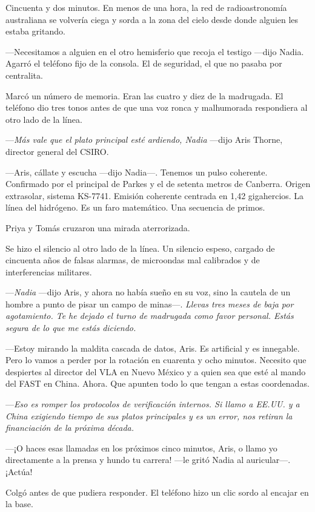 \documentclass[11pt,a5paper,twoside]{book}
\begin{document}
Cincuenta y dos minutos. En menos de una hora, la red de radioastronomía australiana se volvería ciega y sorda a la zona del cielo desde donde alguien les estaba gritando.

—Necesitamos a alguien en el otro hemisferio que recoja el testigo —dijo Nadia. Agarró el teléfono fijo de la consola. El de seguridad, el que no pasaba por centralita.

Marcó un número de memoria. Eran las cuatro y diez de la madrugada. El teléfono dio tres tonos antes de que una voz ronca y malhumorada respondiera al otro lado de la línea.

—\textit{Más vale que el plato principal esté ardiendo, Nadia} —dijo Aris Thorne, director general del CSIRO.

—Aris, cállate y escucha —dijo Nadia—. Tenemos un pulso coherente. Confirmado por el principal de Parkes y el de setenta metros de Canberra. Origen extrasolar, sistema KS-7741. Emisión coherente centrada en 1,42 gigahercios. La línea del hidrógeno. Es un faro matemático. Una secuencia de primos.

Priya y Tomás cruzaron una mirada aterrorizada.

Se hizo el silencio al otro lado de la línea. Un silencio espeso, cargado de cincuenta años de falsas alarmas, de microondas mal calibrados y de interferencias militares.

—\textit{Nadia} —dijo Aris, y ahora no había sueño en su voz, sino la cautela de un hombre a punto de pisar un campo de minas—. \textit{Llevas tres meses de baja por agotamiento. Te he dejado el turno de madrugada como favor personal. Estás segura de lo que me estás diciendo.}

—Estoy mirando la maldita cascada de datos, Aris. Es artificial y es innegable. Pero lo vamos a perder por la rotación en cuarenta y ocho minutos. Necesito que despiertes al director del VLA en Nuevo México y a quien sea que esté al mando del FAST en China. Ahora. Que apunten todo lo que tengan a estas coordenadas.

—\textit{Eso es romper los protocolos de verificación internos. Si llamo a EE.UU. y a China exigiendo tiempo de sus platos principales y es un error, nos retiran la financiación de la próxima década.}

—¡O haces esas llamadas en los próximos cinco minutos, Aris, o llamo yo directamente a la prensa y hundo tu carrera! —le gritó Nadia al auricular—. ¡Actúa!

Colgó antes de que pudiera responder. El teléfono hizo un clic sordo al encajar en la base.
\end{document}

